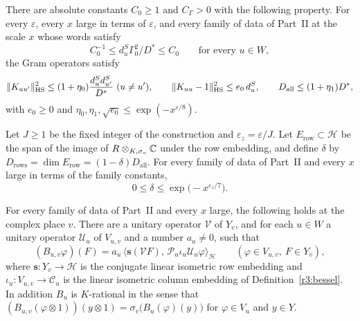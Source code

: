 \begin{theorem}\label{w2:S}
There are absolute constants $C_0\ge1$ and $C_\Gamma>0$ with the following property. For every $\varepsilon$, every $x$ large in terms of $\varepsilon$, and every family of data of Part~II at the scale $x$ whose words satisfy
\begin{equation}\label{w2:window}
C_0^{-1}\le d^S_u\Gamma_0^2/D^*\le C_0\qquad\text{for every }u\in W,
\end{equation}
the Gram operators satisfy
\[
\lVert K_{uu'}\rVert_{\mathrm{HS}}^2\le(1+\eta_0)\frac{d^S_ud^S_{u'}}{D^*}\ (u\ne u'),\qquad\lVert K_{uu}-1\rVert_{\mathrm{HS}}^2\le e_0\,d^S_u,\qquad D_{\mathrm{all}}\le(1+\eta_1)D^*,
\]
with $e_0\ge0$ and $\eta_0,\eta_1,\sqrt{e_0}\le\exp(-x^{\varepsilon/8})$.
\end{theorem}

\begin{theorem}\label{w2:I}
Let $J\ge1$ be the fixed integer of the construction and $\varepsilon_z=\varepsilon/J$. Let $E_{\mathrm{row}}\subset\mathcal H$ be the span of the image of $R\otimes_{K,\sigma_v}\mathbb C$ under the row embedding, and define $\delta$ by $D_{\mathrm{rows}}=\dim E_{\mathrm{row}}=(1-\delta)D_{\mathrm{all}}$. For every family of data of Part~II and every $x$ large in terms of the family constants,
\[
0\le\delta\le\exp\bigl(-x^{\varepsilon_z/7}\bigr).
\]
\end{theorem}

\begin{theorem}\label{w2:B}
For every family of data of Part~II and every $x$ large, the following holds at the complex place $v$. There are a unitary operator $\mathcal V$ of $Y_v$, and for each $u\in W$ a unitary operator $\mathcal U_u$ of $V_{u,v}$ and a number $a_u\ne0$, such that
\begin{equation}\label{w2:besselid}
(B_{u,v}\varphi)(F)=a_u\,\bigl\langle\mathbf s(\mathcal VF),\,\mathcal P_u\iota_u\mathcal U_u\varphi\bigr\rangle_{\mathcal H}\qquad(\varphi\in V_{u,v},\ F\in Y_v),
\end{equation}
where $\mathbf s\colon Y_v\to\mathcal H$ is the conjugate linear isometric row embedding and $\iota_u\colon V_{u,v}\to\mathcal C_u$ is the linear isometric column embedding of Definition~\ref{r3:bessel}. In addition $B_u$ is $K$-rational in the sense that $(B_{u,v}(\varphi\otimes1))(y\otimes1)=\sigma_v\bigl(B_u(\varphi)(y)\bigr)$ for $\varphi\in V_u$ and $y\in Y$.
\end{theorem}

